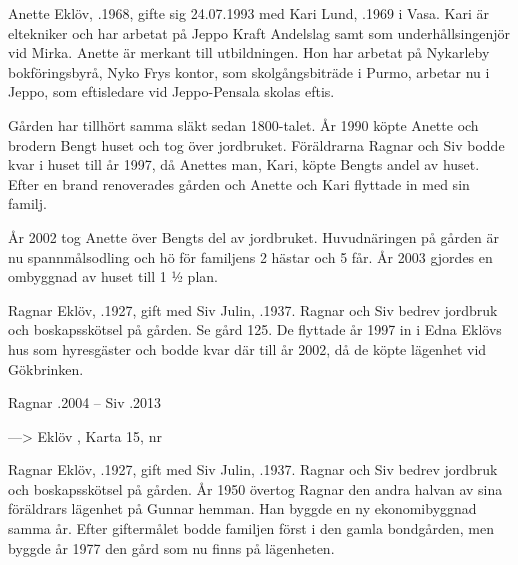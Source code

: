 Anette Eklöv, .1968, gifte sig 24.07.1993 med Kari Lund, .1969 i Vasa. Kari är eltekniker och har arbetat på Jeppo Kraft Andelslag samt som underhållsingenjör vid Mirka. Anette är merkant till utbildningen. Hon 	har arbetat på Nykarleby bokföringsbyrå, Nyko Frys kontor, som skolgångsbiträde i Purmo, arbetar nu i Jeppo, som eftisledare vid Jeppo-Pensala skolas eftis.

\begin{jhchildren}
  \item {}
  \item {}
  \item {}
\end{jhchildren}

Gården har tillhört samma släkt sedan 1800-talet. År 1990 köpte Anette och brodern Bengt huset och tog över jordbruket. Föräldrarna Ragnar och Siv bodde kvar i huset till år 1997, då Anettes man, Kari, köpte Bengts andel av huset. Efter en brand renoverades gården och Anette och Kari flyttade in med sin familj.

År 2002 tog Anette över Bengts del av jordbruket. Huvudnäringen på gården är nu spannmålsodling och hö för familjens 2 hästar och 5 får. År 2003 gjordes en ombyggnad av huset till 1 ½ plan.


Ragnar Eklöv, .1927, gift med Siv Julin, .1937. Ragnar och Siv bedrev jordbruk och boskapsskötsel på gården. Se gård 125. De flyttade år 1997 in i Edna Eklövs hus som hyresgäster och bodde kvar där till år 2002, då de köpte lägenhet vid Gökbrinken.

Ragnar .2004  --  Siv .2013


---> Eklöv 	, Karta 15,   nr 



Ragnar Eklöv, .1927, gift med Siv Julin, .1937. Ragnar och Siv bedrev jordbruk och boskapsskötsel på gården. År 1950 övertog Ragnar den andra halvan av sina föräldrars lägenhet på Gunnar hemman. Han byggde en ny ekonomibyggnad samma år. Efter giftermålet bodde familjen först i den gamla bondgården, men byggde år 1977 den gård som nu finns på lägenheten.

